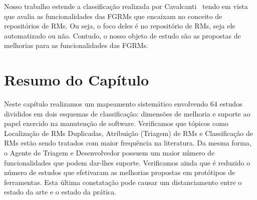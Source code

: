 Nosso trabalho estende a classificação realizada por
Cavalcanti~\cite{cavalcanti2014challenges} tendo em vista que avalia as
funcionalidades das FGRMs que encaixam no conceito de repositórios de RMs. Ou
seja, o foco deles é no repositório de RMs, seja ele automatizado ou não.
Contudo, o nosso objeto de estudo são as propostas de melhorias para as
funcionalidades das FGRMs.

\section{Resumo do Capítulo}
\label{sec:resumo_capitulo}

Neste capítulo realizamos um mapeamento sistemático envolvendo 64 estudos
divididos em dois esquemas de classificação: dimensões de melhoria e suporte ao
papel exercido na manutenção de software. Verificamos que tópicos como
Localização de RMs Duplicadas, Atribuição (Triagem) de RMs e Classificação de
RMs estão sendo tratados com maior frequência na literatura. Da mesma forma, o
Agente de Triagem e Desenvolvedor possuem um maior número de funcionalidades
que podem dar-lhes suporte. Verificamos ainda que é reduzido o número de
estudos que efetivaram as melhorias propostas em protótipos de ferramentas.
Esta última constatação pode causar um distanciamento entre o estado da arte e
o estado da prática.